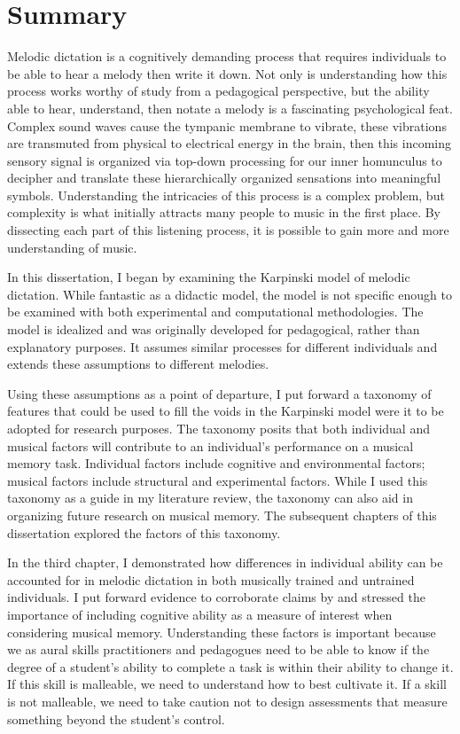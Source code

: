 \documentclass[12pt,]{book}
\begin{document}
\clearpage

\hypertarget{summary}{%
\chapter{Summary}\label{summary}}

Melodic dictation is a cognitively demanding process that requires individuals to be able to hear a melody then write it down.
Not only is understanding how this process works worthy of study from a pedagogical perspective, but the ability able to hear, understand, then notate a melody is a fascinating psychological feat.
Complex sound waves cause the tympanic membrane to vibrate, these vibrations are transmuted from physical to electrical energy in the brain, then this incoming sensory signal is organized via top-down processing for our inner homunculus to decipher and translate these hierarchically organized sensations into meaningful symbols.
Understanding the intricacies of this process is a complex problem, but complexity is what initially attracts many people to music in the first place.
By dissecting each part of this listening process, it is possible to gain more and more understanding of music.

In this dissertation, I began by examining the Karpinski model of melodic dictation.
While fantastic as a didactic model, the model is not specific enough to be examined with both experimental and computational methodologies.
The model is idealized and was originally developed for pedagogical, rather than explanatory purposes.
It assumes similar processes for different individuals and extends these assumptions to different melodies.

Using these assumptions as a point of departure, I put forward a taxonomy of features that could be used to fill the voids in the Karpinski model were it to be adopted for research purposes.
The taxonomy posits that both individual and musical factors will contribute to an individual's performance on a musical memory task.
Individual factors include cognitive and environmental factors; musical factors include structural and experimental factors.
While I used this taxonomy as a guide in my literature review, the taxonomy can also aid in organizing future research on musical memory.
The subsequent chapters of this dissertation explored the factors of this taxonomy.

In the third chapter, I demonstrated how differences in individual ability can be accounted for in melodic dictation in both musically trained and untrained individuals.
I put forward evidence to corroborate claims by \citet{berzWorkingMemoryMusic1995} and stressed the importance of including cognitive ability as a measure of interest when considering musical memory.
Understanding these factors is important because we as aural skills practitioners and pedagogues need to be able to know if the degree of a student's ability to complete a task is within their ability to change it.
If this skill is malleable, we need to understand how to best cultivate it.
If a skill is not malleable, we need to take caution not to design assessments that measure something beyond the student's control.
\end{document}
